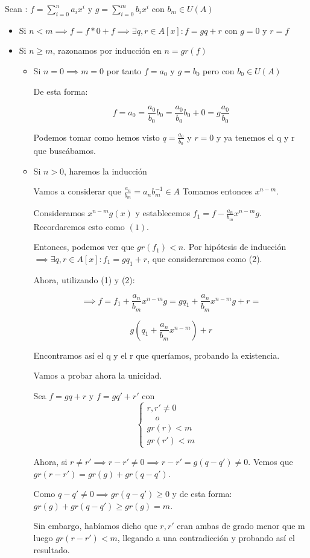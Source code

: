 \documentclass[11pt, a4paper, titlepage]{article}
\makeatletter
\renewenvironment{proof}[1][\proofname] {\vspace{-15pt}\par\pushQED{\qed}\normalfont\topsep6\p@\@plus6\p@\relax\trivlist\item[\hskip\labelsep\it#1\@addpunct{.}]\ignorespaces}{\popQED\endtrivlist\@endpefalse}
\theoremstyle{theorem-style}
\theoremstyle{definition-style}
\theoremstyle{remark-style}
\theoremstyle{example-style}
\makeatother
\begin{document}
\newpage
\begin{proof}
	
	Sean : $f = \sum_{i=0}^n a_i x^i$ y $g = \sum_{i=0}^m b_i x^i$ con $b_m \in U(A)$
	
	\begin{itemize}
	
	\item Si $n< m \implies f = f * 0 + f \implies \exists q,r\in A[x] : f = gq+r$ con $g=0$ y $r = f$
	
	\item Si $n\geq m$, razonamos por inducción en $n=gr(f)$
	\begin{itemize}
	
	\item Si $n=0 \implies m = 0$ por tanto $f=a_0$ y $g=b_0$ pero con $b_0 \in U(A)$
	
	De esta forma:
	
	\[
	f = a_0 = \frac{a_0}{b_0}b_0 = \frac{a_0}{b_0}b_0 + 0 = g\frac{a_0}{b_0}
	\]
	
	Podemos tomar como hemos visto $q=\frac{a_0}{b_0}$ y $r=0$ y ya tenemos el q y r que buscábamos.
	
	\item Si $n> 0$, haremos la inducción
	
	Vamos a considerar que $\frac{a_n}{b_m} = a_n b_m^{-1} \in A$ Tomamos entonces $x^{n-m}$.
	
	Consideramos $x^{n-m}g(x)$ y establecemos $f_1 = f - \frac{a_n}{b_m}x^{n-m}g$. Recordaremos esto como $(1)$.
	
	Entonces, podemos ver que $gr(f_1) < n$. Por hipótesis de inducción $\implies \exists q,r \in A[x] : f_1 = gq_1 + r$, que consideraremos como (2).
	
	Ahora, utilizando (1) y (2):
	
	 \[
	 \implies f = f_1 +\frac{a_n}{b_m}x^{n-m}g = gq_1 + \frac{a_n}{b_m}x^{n-m}g +r = 
	 \]
	 
	 \[
	 g(q_1 + \frac{a_n}{b_m}x^{n-m}) + r
	 \]
	
	Encontramos así el q y el r que queríamos, probando la existencia.
	
	Vamos a probar ahora la unicidad.
	
	Sea $f=gq+r$ y $f= gq' +r'$ con
	\[
    \begin{cases}
		 r,r' \neq 0\\
		  \quad o \\
 gr(r) < m 
 \\ gr(r') < m
		   
\end{cases}
	\quad
	\]
	
	Ahora, si $r\neq r'\implies r-r' \neq 0 \implies r-r' = g(q-q') \neq 0$.
	Vemos que $gr(r-r') = gr(g)+ gr(q-q')$.
	
 Como $q-q' \neq 0 \implies gr(q-q') \geq 0 $ y de esta forma: $gr(g)+ gr(q-q') \geq gr(g) = m$.
 
 Sin embargo, habíamos dicho que $r,r'$ eran ambas de grado menor que m luego $gr(r-r') < m$, llegando a una contradicción y probando así el resultado.
\end{itemize} 
	
	
\end{itemize}
\end{proof}
\end{document}

